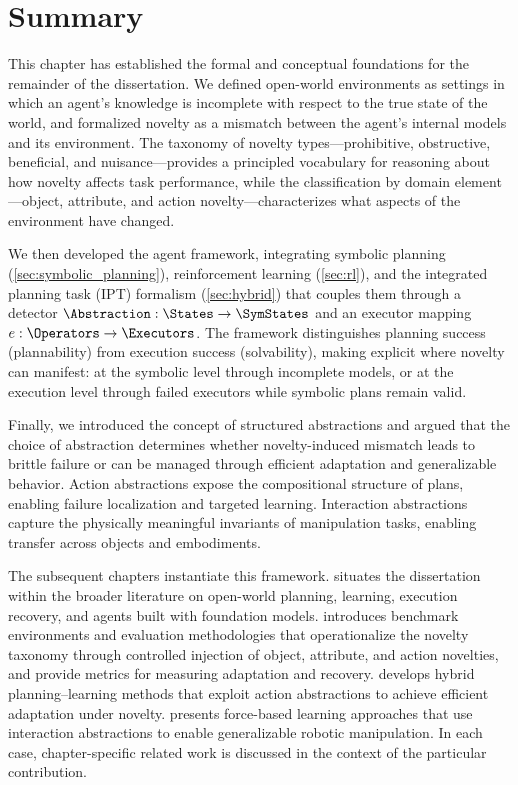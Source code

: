 \section{Summary}\label{sec:ch3_summary}

This chapter has established the formal and conceptual foundations for the remainder of the dissertation. We defined open-world environments as settings in which an agent's knowledge is incomplete with respect to the true state of the world, and formalized novelty as a mismatch between the agent's internal models and its environment. The taxonomy of novelty types---prohibitive, obstructive, beneficial, and nuisance---provides a principled vocabulary for reasoning about how novelty affects task performance, while the classification by domain element---object, attribute, and action novelty---characterizes what aspects of the environment have changed.

We then developed the agent framework, integrating symbolic planning (\cref{sec:symbolic_planning}), reinforcement learning (\cref{sec:rl}), and the integrated planning task (IPT) formalism (\cref{sec:hybrid}) that couples them through a detector $\Abstraction : \States \rightarrow \SymStates$ and an executor mapping $e : \Operators \rightarrow \Executors$. The framework distinguishes planning success (plannability) from execution success (solvability), making explicit where novelty can manifest: at the symbolic level through incomplete models, or at the execution level through failed executors while symbolic plans remain valid.

Finally, we introduced the concept of structured abstractions and argued that the choice of abstraction determines whether novelty-induced mismatch leads to brittle failure or can be managed through efficient adaptation and generalizable behavior. Action abstractions expose the compositional structure of plans, enabling failure localization and targeted learning. Interaction abstractions capture the physically meaningful invariants of manipulation tasks, enabling transfer across objects and embodiments.

The subsequent chapters instantiate this framework.  situates the dissertation within the broader literature on open-world planning, learning, execution recovery, and agents built with foundation models.
 introduces benchmark environments and evaluation methodologies that operationalize the novelty taxonomy through controlled injection of object, attribute, and action novelties, and provide metrics for measuring adaptation and recovery.  develops hybrid planning--learning methods that exploit action abstractions to achieve efficient adaptation under novelty.  presents force-based learning approaches that use interaction abstractions to enable generalizable robotic manipulation. In each case, chapter-specific related work is discussed in the context of the particular contribution.